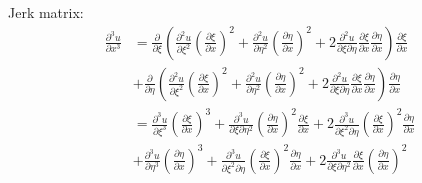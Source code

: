 \documentclass[twoside, 11pt, a4paper]{article}
\begin{document}
Jerk matrix:
\[
  \begin{split}
    \frac{\partial^3u}{\partial x^3} &= \frac{\partial}{\partial\xi}\left(\frac{\partial^2u}{\partial \xi^2}\left(\frac{\partial\xi}{\partial x}\right)^2 + \frac{\partial^2u}{\partial \eta^2}\left(\frac{\partial\eta}{\partial x}\right)^2 + 2 \frac{\partial^2u}{\partial\xi\partial\eta}\frac{\partial\xi}{\partial x}\frac{\partial\eta}{\partial x}\right)\frac{\partial\xi}{\partial x}  \\
    &+\frac{\partial}{\partial\eta}\left(\frac{\partial^2u}{\partial \xi^2}\left(\frac{\partial\xi}{\partial x}\right)^2 + \frac{\partial^2u}{\partial \eta^2}\left(\frac{\partial\eta}{\partial x}\right)^2 + 2 \frac{\partial^2u}{\partial\xi\partial\eta}\frac{\partial\xi}{\partial x}\frac{\partial\eta}{\partial x}\right)\frac{\partial\eta}{\partial x} \\
    &= \frac{\partial^3u}{\partial\xi^3}\left(\frac{\partial\xi}{\partial x}\right)^3 + \frac{\partial^3u}{\partial \xi\partial\eta^2}\left(\frac{\partial\eta}{\partial x}\right)^2\frac{\partial\xi}{\partial x} + 2\frac{\partial^3u}{\partial\xi^2\partial\eta}\left(\frac{\partial\xi}{\partial x}\right)^2\frac{\partial\eta}{\partial x} \\
    &+\frac{\partial^3u}{\partial\eta^3}\left(\frac{\partial\eta}{\partial x}\right)^3 + \frac{\partial^3u}{\partial \xi^2\partial\eta}\left(\frac{\partial\xi}{\partial x}\right)^2\frac{\partial\eta}{\partial x} + 2\frac{\partial^3u}{\partial\xi\partial\eta^2}\frac{\partial\xi}{\partial x}\left(\frac{\partial\eta}{\partial x}\right)^2
  \end{split}
\]
\end{document}
